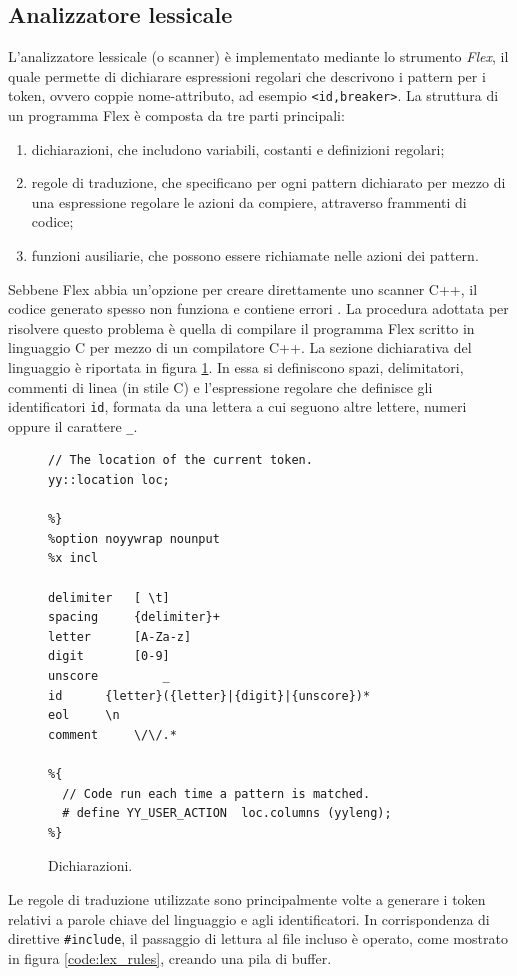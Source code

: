 \subsection{Analizzatore lessicale}
L'analizzatore lessicale (o scanner) è implementato mediante lo strumento \emph{Flex}, il quale permette di dichiarare espressioni regolari che descrivono i pattern per i token, ovvero coppie nome-attributo, ad esempio \verb|<id,breaker>|. La struttura di un programma Flex  è composta da tre parti principali:
\begin{enumerate}
\item dichiarazioni, che includono variabili, costanti e definizioni regolari;
\item regole di traduzione, che specificano per ogni pattern dichiarato per mezzo di una espressione regolare le azioni da compiere, attraverso frammenti di codice;
\item funzioni ausiliarie, che possono essere richiamate nelle azioni dei pattern.
\end{enumerate}
Sebbene Flex abbia un'opzione per creare direttamente uno scanner C++, il codice generato spesso non funziona e contiene errori\cite{book:bison} .
La procedura adottata per risolvere questo problema è quella di compilare il programma Flex scritto in linguaggio C per mezzo di un compilatore C++.
La sezione dichiarativa del linguaggio è riportata in figura \ref{code:lex_decl}. In essa si definiscono spazi, delimitatori, commenti di linea (in stile C) e l'espressione regolare che definisce gli identificatori \verb|id|, formata da una lettera a cui seguono altre lettere, numeri oppure il carattere \verb|_|.

\begin{figure}[htbp]
\begin{verbatim}
// The location of the current token.
yy::location loc;

%}
%option noyywrap nounput
%x incl

delimiter	[ \t]
spacing		{delimiter}+
letter		[A-Za-z]
digit		[0-9]
unscore         _
id		{letter}({letter}|{digit}|{unscore})*
eol		\n
comment		\/\/.*

%{
  // Code run each time a pattern is matched.
  # define YY_USER_ACTION  loc.columns (yyleng);
%}
\end{verbatim}
\caption{Dichiarazioni.}
\label{code:lex_decl}
\end{figure}

Le regole di traduzione utilizzate sono principalmente volte a generare i token relativi a parole chiave del linguaggio e agli identificatori.
In corrispondenza di direttive \verb|#include|, il passaggio di lettura al file incluso è operato, come mostrato in figura \ref{code:lex_rules}, creando una pila di buffer. 

